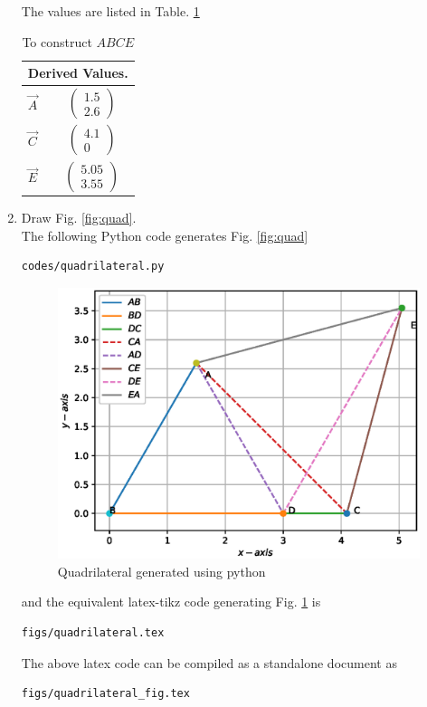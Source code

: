 \begin{enumerate}[label=\thesection.\arabic*.,ref=\thesection.\theenumi]
The values are listed in 
Table. \ref{table:table2} 
\begin{table}[ht!]
\centering
\begin{tabular}{ |p{3cm}|p{3cm}|  }
\hline
 \multicolumn{2}{|c|}{Derived Values.} \\
\hline
$\vec{A}$ & $$\begin{pmatrix}1.5\\2.6\end{pmatrix}$$\\					
\hline
$\vec{C}$ & $$\begin{pmatrix}4.1\\0\end{pmatrix} $$\\
\hline
$\vec{E}$ & $$\begin{pmatrix}5.05\\3.55\end{pmatrix} $$\\
\hline
\end{tabular}
\caption{To construct $ABCE$}
\label{table:table2}
\end{table}
%
\item Draw Fig. \ref{fig:quad}.	
\\
\solution The  following Python code generates Fig. \ref{fig:quad}
%
\begin{lstlisting}
codes/quadrilateral.py
\end{lstlisting}
\begin{figure}[!ht]
\centering
\includegraphics[width=\columnwidth]{./figs/quadrilateral.eps}
\caption{Quadrilateral generated using python}
\label{fig:quad_py}
\end{figure}

%
and the equivalent latex-tikz code generating Fig. \ref{fig:quad_py} is 
\begin{lstlisting}
figs/quadrilateral.tex
\end{lstlisting}
%
The above latex code can be compiled as a standalone document as
\begin{lstlisting}
figs/quadrilateral_fig.tex
\end{lstlisting}

\end{enumerate}

